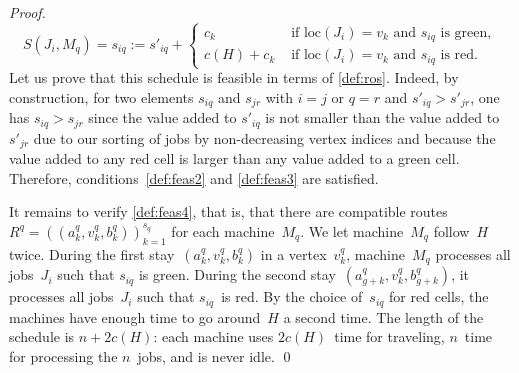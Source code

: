 \documentclass[natbib,sort,smallextended,envcountsame,envcountsect,numbook]{svjour3}
\newcommand{\HC}{H}
\newcommand{\loc}{\text{loc}}
\begin{document}
\begin{proof}
\[
S(J_i,M_q)=s_{iq}:=s'_{iq}+
\begin{cases}
  c_{k}&\text{ if $\loc(J_i)=v_k$ and $s_{iq}$ is green},\\
  c(\HC)+c_k&\text{ if $\loc(J_i)=v_k$ and $s_{iq}$ is red}.
\end{cases}
\]
Let us prove that this schedule is feasible in terms of \cref{def:ros}. Indeed, by construction, for two elements $s_{iq}$ and $s_{jr}$ with \(i=j\) or \(q=r\) and $s'_{iq}>s'_{jr}$, one has $s_{iq}>s_{jr}$ since the value added to $s'_{iq}$ is not smaller than the value added to $s'_{jr}$ due to our sorting of jobs by non-decreasing vertex indices and because the value added to any red cell is larger than any value added to a green cell.  Therefore, conditions~\eqref{def:feas2} and \eqref{def:feas3} are satisfied.

It remains to verify \eqref{def:feas4}, that is,
that there are compatible routes~\(R^q=((a_k^q,v_k^q,b_k^q))_{k=1}^{s_q}\)
for each machine~\(M_q\).
We let machine~\(M_q\) follow~\(\HC\) twice.
During the first stay~\((a_k^q,v_k^q,b_k^q)\) in a vertex~\(v_k^q\),
machine~\(M_q\) processes all jobs~\(J_i\)
such that \(s_{iq}\) is green.
During the second stay~\((a_{g+k}^q,v_k^q,b_{g+k}^q)\),
it processes all jobs~\(J_i\)
such that \(s_{iq}\)~is red.
By the choice of~\(s_{iq}\) for red cells, the machines have enough time to go around~\(H\) a second time. 
The length of the schedule is $n+2c(\HC)$:
each machine uses \(2c(\HC)\)~time for traveling,
\(n\)~time for processing the \(n\)~jobs,
and is never idle.
\qed\end{proof}
\end{document}
